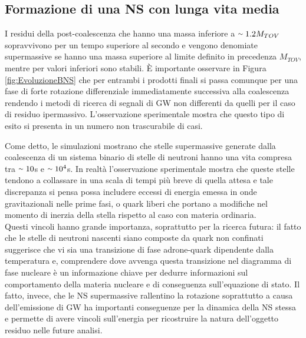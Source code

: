 \subsection{Formazione di una NS con lunga vita media}
\label{subsection:long_lived}
I residui della post-coalescenza che hanno una massa inferiore a $\smallsim1.2M_{TOV}$ sopravvivono per un tempo superiore al secondo e vengono denomiate supermassive se hanno una massa superiore al limite definito in precedenza $M_{TOV}$, mentre per valori inferiori sono stabili.
È importante osservare in Figura \ref{fig:EvoluzioneBNS} che per entrambi i prodotti finali si passa comunque per una fase di forte rotazione differenziale immediatamente successiva alla coalescenza rendendo i metodi di ricerca di segnali di GW non differenti da quelli per il caso di residuo ipermassivo.
L'osservazione sperimentale mostra che questo tipo di esito si presenta in un numero non trascurabile di casi.

Come detto, le simulazioni mostrano che stelle supermassive generate dalla coalescenza di un sistema binario di stelle di neutroni hanno una vita compresa tra $\smallsim10$s e $\smallsim10^4$s. In realtà l'osservazione sperimentale mostra che queste stelle tendono a collassare in una scala di tempi più breve di quella attesa e tale discrepanza si pensa possa includere eccessi di energia emessa in onde gravitazionali nelle prime fasi, o quark liberi che portano a modifiche nel momento di inerzia della stella rispetto al caso con materia ordinaria\cite{sarin2020evolution}.\\
Questi vincoli hanno grande importanza, soprattutto per la ricerca futura: il fatto che le stelle di neutroni nascenti siano composte da quark non confinati suggerisce che vi sia una transizione di fase adrone-quark dipendente dalla temperatura e, comprendere dove avvenga questa transizione nel diagramma di fase nucleare è un informazione chiave per dedurre informazioni sul comportamento della materia nucleare e di conseguenza sull'equazione di stato.
Il fatto, invece, che le NS supermassive rallentino la rotazione soprattutto a causa dell'emissione di GW ha importanti conseguenze per la dinamica della NS stessa e permette di avere vincoli sull'energia per ricostruire la natura dell'oggetto residuo nelle future analisi\cite{sarin2020evolution}.

